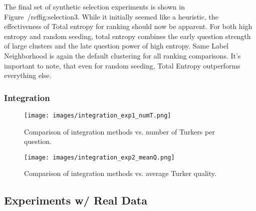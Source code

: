 The final set of synthetic selection experiments is shown in Figure~/ref{fig:selection3}.  While it initially seemed like a heuristic, the effectiveness of Total entropy for ranking should now be apparent.  For both high entropy and random seeding, total entropy combines the early question strength of large clusters and the late question power of high entropy.  Same Label Neighborhood is again the default clustering for all ranking comparisons.  It's important to note, that even for random seeding, Total Entropy outperforms everything else.



\subsubsection{Integration}
\begin{figure}
		\texttt{[image: images/integration\_exp1\_numT.png]}
		\label{fig:integrate1}
		\caption{Comparison of integration methods vs. number of Turkers per question.} 
\end{figure}
\begin{figure}
		\texttt{[image: images/integration\_exp2\_meanQ.png]}
		\label{fig:integrate2}
		\caption{Comparison of integration methods vs. average Turker quality.} 
\end{figure}





\subsection{Experiments w/ Real Data}


